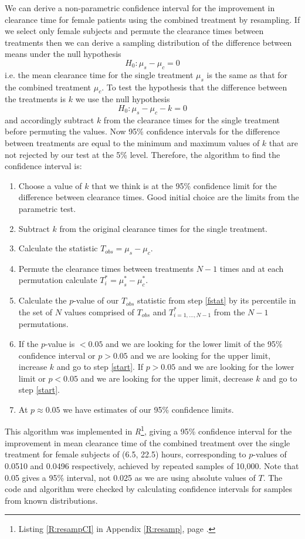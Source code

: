We can derive a non-parametric confidence interval for the improvement in clearance time for female patients using the combined treatment by resampling. If we select only female subjects and permute the clearance times between treatments then we can derive a sampling distribution of the difference between means under the null hypothesis
$$H_{0}:\mu_{s}-\mu_{c}=0$$
i.e. the mean clearance time for the single treatment $\mu_{s}$ is the same as that for the combined treatment $\mu_{c}$. To test the hypothesis that the difference between the treatments is $k$ we use the null hypothesis
$$H_{0}:\mu_{s}-\mu_{c}-k=0$$
and accordingly subtract $k$ from the clearance times for the single treatment before permuting the values. Now 95\% confidence intervals for the difference between treatments are equal to the minimum and maximum values of $k$ that are not rejected by our test at the 5\% level. Therefore, the algorithm to find the confidence interval is:
\begin{enumerate}
\item Choose a value of $k$ that we think is at the 95\% confidence limit for the difference between clearance times. Good initial choice are the limits from the parametric test.
\item Subtract $k$ from the original clearance times for the single treatment.\label{start}
\item Calculate the statistic $T_{obs}=\mu_{s}-\mu_{c}$.\label{fstat}
\item Permute the clearance times between treatments $N-1$ times and at each permutation calculate $T^{*}_{i}=\mu_{s}^{*}-\mu_{c}^{*}$.
\item Calculate the $p$-value of our $T_{obs}$ statistic from step \ref{fstat} by its percentile in the set of $N$ values comprised of $T_{obs}$ and $T_{i=1,...,N-1}^{*}$ from the $N-1$ permutations.
\item If the $p$-value is $<0.05$ and we are looking for the lower limit of the 95\% confidence interval or $p>0.05$ and we are looking for the upper limit, increase $k$ and go to step \ref{start}. If $p>0.05$ and we are looking for the lower limit or $p<0.05$ and we are looking for the upper limit, decrease $k$ and go to step \ref{start}.
\item At $p\approx 0.05$ we have estimates of our 95\% confidence limits.
\end{enumerate}
This algorithm was implemented in \emph{R}\footnote{Listing \ref{R:resampCI} in Appendix \ref{R:resamp}, page \pageref{R:resampCI}.}, giving a 95\% confidence interval for the improvement in mean clearance time of the combined treatment over the single treatment for female subjects of (6.5, 22.5) hours, corresponding to $p$-values of 0.0510 and 0.0496 respectively, achieved by repeated samples of 10,000. Note that 0.05 gives a 95\% interval, not 0.025 as we are using absolute values of $T$. The code and algorithm were checked by calculating confidence intervals for samples from known distributions.

